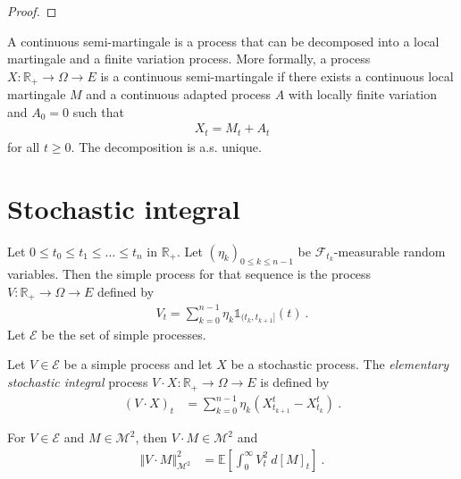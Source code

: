 \begin{proof}

\end{proof}


\begin{definition}\label{def:continuousSemiMartingale}
A continuous semi-martingale is a process that can be decomposed into a local martingale and a finite variation process.
More formally, a process $X : \mathbb{R}_+ \to \Omega \to E$ is a continuous semi-martingale if there exists a continuous local martingale $M$ and a continuous adapted process $A$ with locally finite variation and $A_0 = 0$ such that
\begin{align*}
  X_t = M_t + A_t
\end{align*}
for all $t \ge 0$.
The decomposition is a.s. unique.
\end{definition}


\section{Stochastic integral}


\begin{definition}\label{def:simpleProcess}
Let $0 \le t_0 \le t_1 \le \ldots \le t_n$ in $\mathbb{R}_+$.
Let $(\eta_k)_{0 \le k \le n-1}$ be $\mathcal{F}_{t_k}$-measurable random variables.
Then the simple process for that sequence is the process $V : \mathbb{R}_+ \to \Omega \to E$ defined by
\begin{align*}
  V_t = \sum_{k=0}^{n-1} \eta_k \mathbb{1}_{(t_k, t_{k+1}]}(t)
  \: .
\end{align*}
Let $\mathcal{E}$ be the set of simple processes.
\end{definition}


\begin{definition}\label{def:elemStochIntegral}
Let $V \in \mathcal{E}$ be a simple process and let $X$ be a stochastic process.
The \emph{elementary stochastic integral} process $V \cdot X : \mathbb{R}_+ \to \Omega \to E$ is defined by
\begin{align*}
  (V \cdot X)_t
  &= \sum_{k=0}^{n-1} \eta_k (X^t_{t_{k+1}} - X^t_{t_k})
  \: .
\end{align*}
\end{definition}


\begin{lemma}\label{lem:sq_norm_elemStochIntegral}
For $V \in \mathcal{E}$ and $M \in \mathcal{M}^2$, then $V \cdot M \in \mathcal{M}^2$ and
\begin{align*}
  \Vert V \cdot M \Vert_{\mathcal{M}^2}^2
  &= \mathbb{E}\left[ \int_0^{\infty} V_t^2 \: d[M]_t \right]
  \: .
\end{align*}
\end{lemma}

